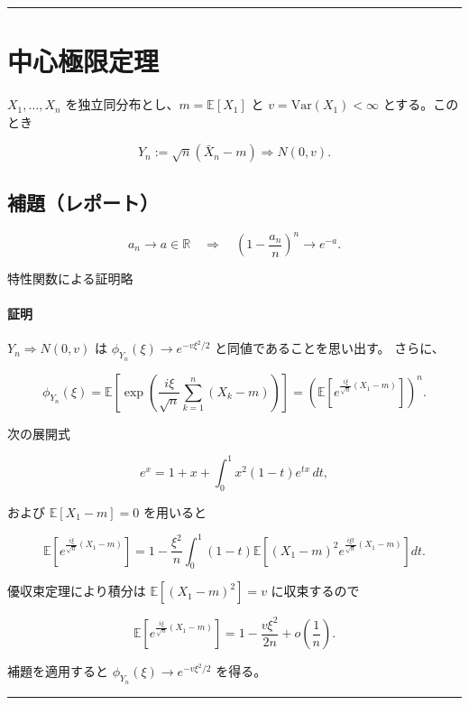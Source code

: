 \documentclass[uplatex,dvipdfmx,11pt,a4paper,openany]{bxjsbook}
\begin{document}
\medskip\hrule\medskip
\section{中心極限定理}
$X_1,\dots,X_n$ を独立同分布とし、$m=\mathbb E[X_1]$ と
                $v=\mathrm{Var}(X_1)<\infty$ とする。このとき

\[Y_n := \sqrt{n}(\bar{X}_n - m) \Rightarrow N(0,v).\]

\subsection{補題（レポート）}
\[a_n \to a \in \mathbb R
                \quad \Longrightarrow \quad
                \left(1-\frac{a_n}{n}\right)^n \to e^{-a}.\]

\begin{detailblock}{特性関数による証明略}
\paragraph{証明}
$Y_n \Rightarrow N(0,v)$ は $\phi_{Y_n}(\xi)\to e^{-v\xi^2/2}$ と同値であることを思い出す。
                        さらに、

\[\phi_{Y_n}(\xi)=\mathbb E\left[\exp\left(\frac{i\xi}{\sqrt{n}}
                        \sum_{k=1}^n (X_k-m)\right)\right]
                        = \left(\mathbb E\left[e^{\frac{i\xi}{\sqrt{n}}(X_1-m)}\right]\right)^n.\]

次の展開式

\[e^x = 1 + x
                        + \int_0^1 x^2 (1-t) e^{tx}\,dt,\]

および $\mathbb E[X_1-m]=0$ を用いると

\[\mathbb E\left[e^{\frac{i\xi}{\sqrt{n}}(X_1-m)}\right]
                        = 1 - \frac{\xi^2}{n}\int_0^1　 (1-t)
                        \mathbb E\left[(X_1-m)^2 e^{\frac{i\xi t}{\sqrt{n}}(X_1-m)}\right]dt.\]

優収束定理により積分は
                        $\mathbb E[(X_1-m)^2]=v$ に収束するので

\[\mathbb E\left[e^{\frac{i\xi}{\sqrt{n}}(X_1-m)}\right]
                        = 1-\frac{v\xi^2}{2n}+o\!\left(\frac{1}{n}\right).\]

補題を適用すると $\phi_{Y_n}(\xi)\to e^{-v\xi^2/2}$ を得る。


\end{detailblock}

\medskip\hrule\medskip
\end{document}
